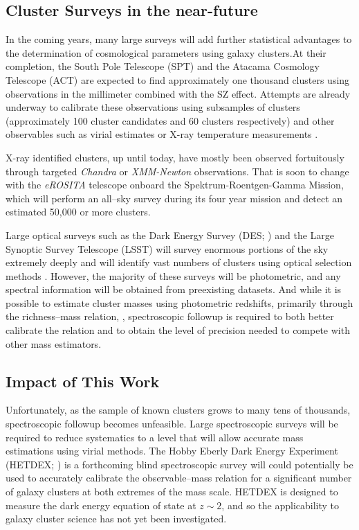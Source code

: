 \documentclass[12pt]{article}
\begin{document}
\subsection{Cluster Surveys in the near-future}
In the coming years, many large surveys will add further statistical advantages to the determination of cosmological parameters using galaxy clusters.At their completion, the South Pole Telescope (SPT) and the Atacama Cosmology Telescope (ACT) are expected to find approximately one thousand clusters using observations in the millimeter combined with the SZ effect. Attempts are already underway to calibrate these observations using subsamples of clusters (approximately 100 cluster candidates and 60 clusters respectively) and other observables such as virial estimates or X-ray temperature measurements . 

X-ray identified clusters, up until today, have mostly been observed fortuitously through targeted \textit{Chandra} or \textit{XMM-Newton} observations. That is soon to change with the \textit{eROSITA} telescope onboard the Spektrum-Roentgen-Gamma Mission, which will perform an all--sky survey during its four year mission and detect an estimated 50,000 or more clusters.

Large optical surveys such as the Dark Energy Survey (DES; \citealt{DES2005}) and the Large Synoptic Survey Telescope (LSST) will survey enormous portions of the sky extremely deeply and will identify vast numbers of clusters using optical selection methods . However, the majority of these surveys will be photometric, and any spectral information will be obtained from preexisting datasets. And while it is possible to estimate cluster masses using photometric redshifts, primarily through the richness--mass relation,  , spectroscopic followup is required to both better calibrate the relation and to obtain the level of precision needed to compete with other mass estimators. 

\subsection{Impact of This Work}
Unfortunately, as the sample of known clusters grows to many tens of thousands, spectroscopic followup becomes unfeasible. Large spectroscopic surveys will be required to reduce systematics to a level that will allow accurate mass estimations using virial methods. The Hobby Eberly Dark Energy Experiment (HETDEX; \citealt{Hill2008}) is a forthcoming blind spectroscopic survey will could potentially be used to accurately calibrate the observable--mass relation for a significant number of galaxy clusters at both extremes of the mass scale. HETDEX is designed to measure the dark energy equation of state at $z\sim2$, and so the applicability to galaxy cluster science has not yet been investigated.
\end{document}
